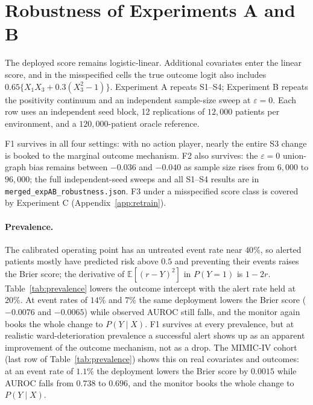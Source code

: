 \documentclass[letterpaper]{article} %
\newcommand{\E}{\mathbb{E}}
\begin{document}
\section{Robustness of Experiments A and B}
\label{app:robustness}
The deployed score remains logistic-linear. Additional covariates enter the
linear score, and in the misspecified cells the true outcome logit also includes
$0.65\{X_1X_3+0.3(X_3^2-1)\}$. Experiment A repeats S1--S4; Experiment B
repeats the positivity continuum and an independent sample-size sweep at
$\varepsilon=0$. Each row uses an independent seed block, 12 replications of
$12{,}000$ patients per environment, and a $120{,}000$-patient oracle reference.


F1 survives in all four settings: with no action player, nearly the entire S3
change is booked to the marginal outcome mechanism. F2 also survives: the
$\varepsilon=0$ union-graph bias remains between $-0.036$ and $-0.040$ as
sample size rises from $6{,}000$ to $96{,}000$; the full independent-seed
sweeps and all S1--S4 results are in \texttt{merged\_expAB\_robustness.json}.
F3 under a misspecified score class is covered by Experiment C (Appendix~\ref{app:retrain}).

\paragraph{Prevalence.} The calibrated operating point has an untreated event
rate near $40\%$, so alerted patients mostly have predicted risk above $0.5$
and preventing their events raises the Brier score; the derivative of
$\E[(r - Y)^2]$ in $P(Y{=}1)$ is $1 - 2r$. Table~\ref{tab:prevalence} lowers
the outcome intercept with the alert rate held at $20\%$. At event rates of
$14\%$ and $7\%$ the same deployment lowers the Brier score ($-0.0076$ and
$-0.0065$) while observed AUROC still falls, and the monitor again books the
whole change to $P(Y \mid X)$. F1 survives at every prevalence, but at
realistic ward-deterioration prevalence a successful alert shows up as an
apparent improvement of the outcome mechanism, not as a drop. The MIMIC-IV
cohort (last row of Table~\ref{tab:prevalence}) shows this on real covariates
and outcomes: at an event rate of $1.1\%$ the deployment lowers the Brier
score by $0.0015$ while AUROC falls from $0.738$ to $0.696$, and the monitor
books the whole change to $P(Y \mid X)$.
\end{document}

